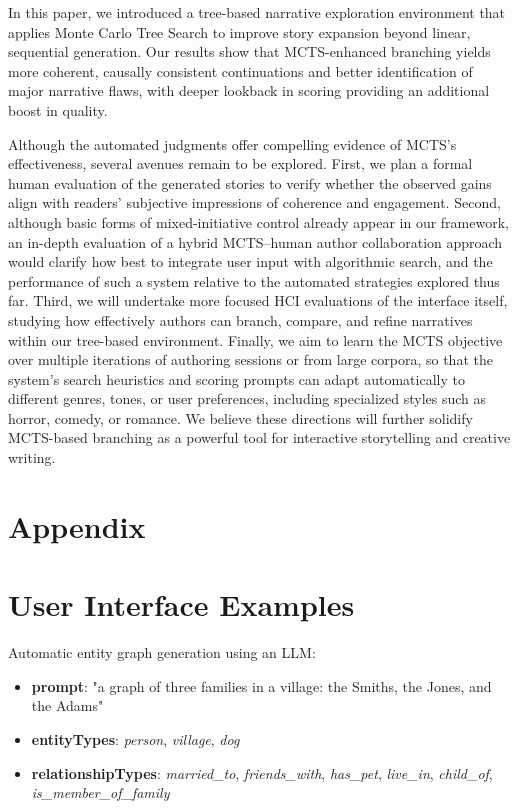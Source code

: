 \documentclass[11pt]{article}
\begin{document}
In this paper, we introduced a tree-based narrative exploration environment that applies Monte Carlo Tree Search to improve story expansion beyond linear, sequential generation. Our results show that MCTS-enhanced branching yields more coherent, causally consistent continuations and better identification of major narrative flaws, with deeper lookback in scoring providing an additional boost in quality.

Although the automated judgments offer compelling evidence of MCTS's effectiveness, several avenues remain to be explored. First, we plan a formal human evaluation of the generated stories to verify whether the observed gains align with readers' subjective impressions of coherence and engagement. Second, although basic forms of mixed-initiative control already appear in our framework, an in-depth evaluation of a hybrid MCTS--human author collaboration approach would clarify how best to integrate user input with algorithmic search, and the performance of such a system relative to the automated strategies explored thus far. Third, we will undertake more focused HCI evaluations of the interface itself, studying how effectively authors can branch, compare, and refine narratives within our tree-based environment. Finally, we aim to learn the MCTS objective over multiple iterations of authoring sessions or from large corpora, so that the system's search heuristics and scoring prompts can adapt automatically to different genres, tones, or user preferences, including specialized styles such as horror, comedy, or romance. We believe these directions will further solidify MCTS-based branching as a powerful tool for interactive storytelling and creative writing.



\appendix
\onecolumn
\section{Appendix}

\section{User Interface Examples}
\label{appendix:ui-examples}

Automatic entity graph generation using an LLM:

\begin{itemize}
    \item \textbf{prompt}: "a graph of three families in a village: the Smiths, the Jones, and the Adams"
    \item \textbf{entityTypes}: \textit{person}, \textit{village}, \textit{dog}
    \item \textbf{relationshipTypes}: \textit{married\_to}, \textit{friends\_with}, \textit{has\_pet}, \textit{live\_in}, \textit{child\_of}, \textit{is\_member\_of\_family}
\end{itemize}
\end{document}
